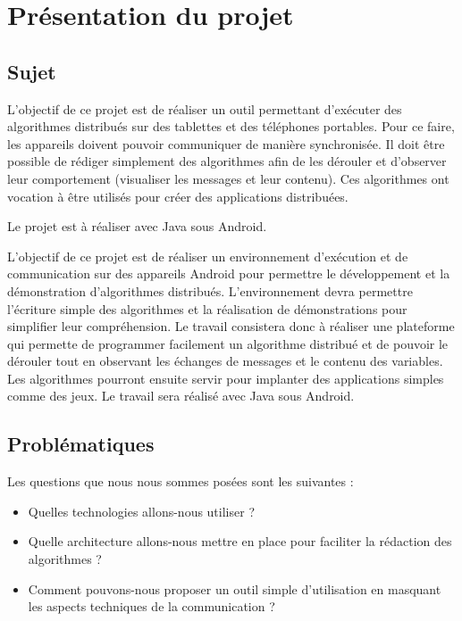 \documentclass[a4paper,10pt]{report}
\begin{document}
\chapter{Présentation du projet}
  \section{Sujet}
  L'objectif de ce projet est de réaliser un outil permettant d'exécuter des algorithmes distribués sur des tablettes et des téléphones portables. Pour ce faire, les appareils doivent pouvoir communiquer de manière synchronisée. Il doit être possible de rédiger simplement des algorithmes afin de les dérouler et d'observer leur comportement (visualiser les messages et leur contenu).  Ces algorithmes ont vocation à être utilisés pour créer des applications distribuées.
  
  Le projet est à réaliser avec Java sous Android.
  
  
  
  L’objectif de ce projet est de réaliser un environnement d’exécution et de communication
  sur des appareils Android pour permettre le développement et la démonstration
  d’algorithmes distribués. L’environnement devra permettre l'écriture simple des algorithmes
  et  la réalisation de démonstrations pour simplifier leur compréhension. Le travail
  consistera donc à réaliser une plateforme qui permette de programmer facilement un algorithme
  distribué et de pouvoir le dérouler tout en observant les échanges de messages et
  le contenu des variables.
  Les algorithmes pourront ensuite servir pour implanter des applications simples comme
  des jeux. Le travail sera réalisé avec Java sous Android.
  
  \section{Problématiques}
  Les questions que nous nous sommes posées sont les suivantes : 
  \begin{itemize}
    \item Quelles technologies allons-nous utiliser ?
    \item Quelle architecture allons-nous mettre en place pour faciliter la rédaction des algorithmes ?
    \item Comment pouvons-nous proposer un outil simple d'utilisation en masquant les aspects techniques de la communication ?
  \end{itemize}
\end{document}
